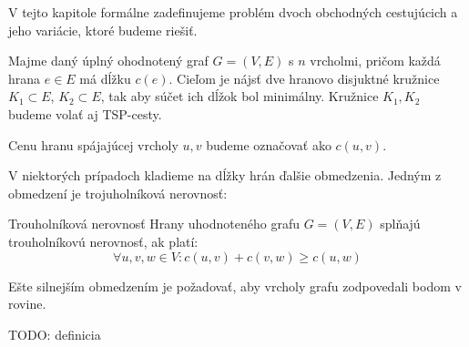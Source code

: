 V tejto kapitole formálne zadefinujeme problém dvoch obchodných cestujúcich
a jeho variácie, ktoré budeme riešiť.

\begin{definicia}
Majme daný úplný ohodnotený graf $G = (V, E)$ s $n$ vrcholmi, pričom každá hrana
$e \in E$ má dĺžku $c(e)$. Cieľom je nájsť dve hranovo disjuktné kružnice $K_1 \subset E$,
$K_2 \subset E$, tak aby súčet ich dĺžok bol minimálny. Kružnice $K_1, K_2$ budeme volať aj
TSP-cesty.
\end{definicia}

\begin{poznamka}
Cenu hranu spájajúcej vrcholy $u, v$ budeme označovať ako $c(u, v)$. 
\end{poznamka}

V niektorých prípadoch kladieme na dĺžky hrán ďalšie obmedzenia.
Jedným z obmedzení je trojuholníková nerovnosť:

\begin{definicia}{Trouholníková nerovnosť}
Hrany uhodnoteného grafu $G = (V, E)$ splňajú trouholníkovú nerovnosť, ak platí:
$$\forall u,v,w \in V: c(u,v) + c(v,w) \geq c(u,w)$$
\end{definicia}

Ešte silnejším obmedzením je požadovať, aby vrcholy grafu zodpovedali bodom v rovine.

TODO: definicia

